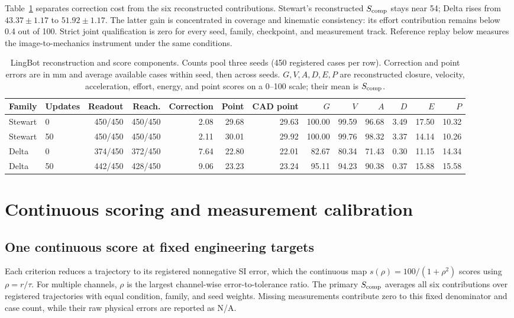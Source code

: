 Table~\ref{app:lingbot-components} separates correction cost from the six reconstructed contributions. Stewart's reconstructed $S_{\rm comp}$ stays near 54; Delta rises from $43.37\pm1.17$ to $51.92\pm1.17$. The latter gain is concentrated in coverage and kinematic consistency: its effort contribution remains below 0.4 out of 100. Strict joint qualification is zero for every seed, family, checkpoint, and measurement track. Reference replay below measures the image-to-mechanics instrument under the same conditions.

\begin{table}[t]
\caption{LingBot reconstruction and score components. Counts pool three seeds (450 registered cases per row). Correction and point errors are in mm and average available cases within seed, then across seeds. $G,V,A,D,E,P$ are reconstructed closure, velocity, acceleration, effort, energy, and point scores on a 0--100 scale; their mean is $S_{\rm comp}$.}
\label{app:lingbot-components}
\centering\small
\setlength{\tabcolsep}{3.5pt}
\begin{tabular}{llrrrrrrrrrrr}
\toprule
Family & Updates & Readout & Reach. & Correction & Point & CAD point & $G$ & $V$ & $A$ & $D$ & $E$ & $P$\\
\midrule
Stewart & 0 & 450/450 & 450/450 & 2.08 & 29.68 & 29.63 & 100.00 & 99.59 & 96.68 & 3.49 & 17.50 & 10.32 \\
Stewart & 50 & 450/450 & 450/450 & 2.11 & 30.01 & 29.92 & 100.00 & 99.76 & 98.32 & 3.37 & 14.14 & 10.26 \\
Delta & 0 & 374/450 & 372/450 & 7.64 & 22.80 & 22.01 & 82.67 & 80.34 & 71.43 & 0.30 & 11.15 & 14.34 \\
Delta & 50 & 442/450 & 428/450 & 9.06 & 23.23 & 23.24 & 95.11 & 94.23 & 90.38 & 0.37 & 15.88 & 15.58 \\
\bottomrule
\end{tabular}
\end{table}

\section{Continuous scoring and measurement calibration}
\label{app:measurement}
\subsection{One continuous score at fixed engineering targets}
Each criterion reduces a trajectory to its registered nonnegative SI error, which the continuous map $s(\rho)=100/(1+\rho^2)$ scores using $\rho=r/\tau$. For multiple channels, $\rho$ is the largest channel-wise error-to-tolerance ratio. The primary $S_{\rm comp}$ averages all six contributions over registered trajectories with equal condition, family, and seed weights. Missing measurements contribute zero to this fixed denominator and case count, while their raw physical errors are reported as N/A.

